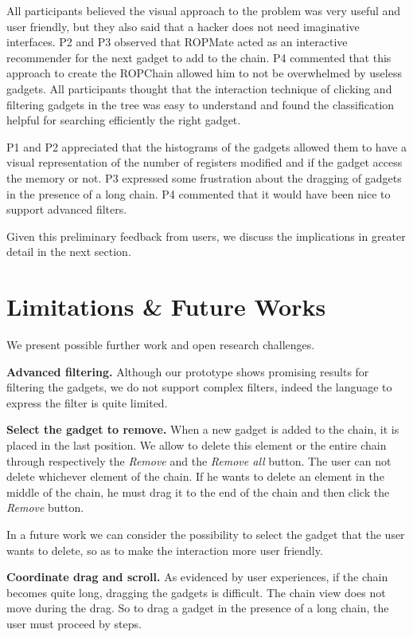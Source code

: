 \documentclass[twocolumn, 11pt]{article}
\begin{document}
All participants believed the visual approach to the problem was very useful and user friendly, but they also said that a hacker does not need imaginative interfaces. P2 and P3 observed that ROPMate acted as an interactive recommender for the next gadget to add to the chain. P4 commented that this approach to create the ROPChain allowed him to not be overwhelmed by useless gadgets. All participants thought that the interaction technique of clicking and filtering gadgets in the tree was easy to understand and found the classification helpful for searching efficiently the right gadget.

P1 and P2 appreciated that the histograms of the gadgets allowed them to have a visual representation of the number of registers modified and if the gadget access the memory or not. P3 expressed some frustration about the dragging of gadgets in the presence of a long chain. P4 commented that it would have been nice to support advanced filters.

Given this preliminary feedback from users, we discuss the implications in greater detail in the next section.

\section{Limitations \& Future Works}
We present possible further work and open research challenges.

\textbf{Advanced filtering.} Although our prototype shows promising results for filtering the gadgets, we do not support complex filters, indeed the language to express the filter is quite limited.

\textbf{Select the gadget to remove.} When a new gadget is added to the chain, it is placed in the last position. We allow to delete this element or the entire chain through respectively the \textit{Remove} and the \textit{Remove all} button. The user can not delete whichever element of the chain. If he wants to delete an element in the middle of the chain, he must drag it to the end of the chain and then click the \textit{Remove} button.

In a future work we can consider the possibility to select the gadget that the user wants to delete, so as to make the interaction more user friendly.

\textbf{Coordinate drag and scroll.} As evidenced by user experiences, if the chain becomes quite long, dragging the gadgets is difficult. The chain view does not move during the drag. So to drag a gadget in the presence of a long chain, the user must proceed by steps.
\end{document}
